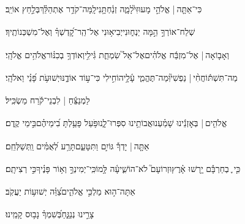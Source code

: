 \documentclass[12pt]{article}
\newcommand{\loc}[1]{\textsuperscript{\locf{#1}}}
\begin{document}
{\loc{ ב}~}‏כִּי־אַתָּ֤ה |  אֱלֹהֵ֣י מָעוּזִּי֮{\hfill}לָמָ֢ה זְנַ֫חְתָּ֥נִי\newline\hspace*{.5em}לָֽמָּה־קֹדֵ֥ר אֶתְהַלֵּ֗ךְ{\hfill}בְּלַ֣חַץ אוֹיֵֽב׃\par

{\loc{ ג}~}‏שְׁלַח־אוֹרְךָ֣  הֵ֣מָּה יַנְח֑וּנִי{\hfill}יְבִיא֥וּנִי אֶל־הַֽר־קׇ֝דְשְׁךָ֗ וְאֶל־מִשְׁכְּנוֹתֶֽיךָ׃\par

{\loc{ ד}~}‏וְאָב֤וֹאָה |  אֶל־מִזְבַּ֬ח אֱלֹהִ֗ים{\hfill}אֶל־אֵל֮ שִׂמְחַ֢ת גִּ֫ילִ֥י\newline\hspace*{.5em}וְאוֹדְךָ֥ בְכִנּ֗וֹר{\hfill}אֱלֹהִ֥ים אֱלֹהָֽי׃\par

{\loc{ ה}~}‏מַה־תִּשְׁתּ֬וֹחֲחִ֨י |  נַפְשִׁי֮{\hfill}וּֽמַה־תֶּהֱמִ֢י עָ֫לָ֥י\newline\hspace*{.5em}הוֹחִ֣ילִי  כִּי־ע֣וֹד אוֹדֶ֑נּוּ{\hfill}יְשׁוּעֹ֥ת פָּ֝נַ֗י וֵאלֹהָֽי׃\par\pend
\ledpb
\pstart[\subsection*{\textcolor{red}{פרק מד}}]\label{פרק מד}
{\loc{ א}~}‏לַמְנַצֵּ֬חַ | לִבְנֵי־קֹ֬רַח מַשְׂכִּֽיל׃\par

{\loc{ ב}~}‏אֱלֹהִ֤ים |  בְּאׇזְנֵ֬ינוּ שָׁמַ֗עְנוּ{\hfill}אֲבוֹתֵ֥ינוּ סִפְּרוּ־לָ֑נוּ\newline\hspace*{.5em}פֹּ֥עַל פָּעַ֥לְתָּ בִ֝ימֵיהֶ֗ם{\hfill}בִּ֣ימֵי קֶֽדֶם׃\par

{\loc{ ג}~}‏אַתָּ֤ה |  יָדְךָ֡ גּוֹיִ֣ם  וַתִּטָּעֵ֑ם{\hfill}תָּרַ֥ע לְ֝אֻמִּ֗ים וַֽתְּשַׁלְּחֵֽם׃\par

{\loc{ ד}~}‏כִּ֤י ֪ בְחַרְבָּ֡ם יָ֥רְשׁוּ אָ֗רֶץ{\hfill}וּזְרוֹעָם֮ לֹא־הוֹשִׁ֢יעָ֫ה לָּ֥מוֹ\newline\hspace*{.5em}כִּֽי־יְמִינְךָ֣  וְא֥וֹר פָּנֶ֗יךָ{\hfill}כִּ֣י רְצִיתָֽם׃\par

{\loc{ ה}~}‏אַתָּה־ה֣וּא מַלְכִּ֣י אֱלֹהִ֑ים{\hfill}צַ֝וֵּ֗ה יְשׁוּע֥וֹת יַעֲקֹֽב׃\par

{\loc{ ו}~}‏ צָרֵ֣ינוּ נְנַגֵּ֑חַ{\hfill}בְּ֝שִׁמְךָ֗ נָב֥וּס קָמֵֽינוּ׃\par
\end{document}
